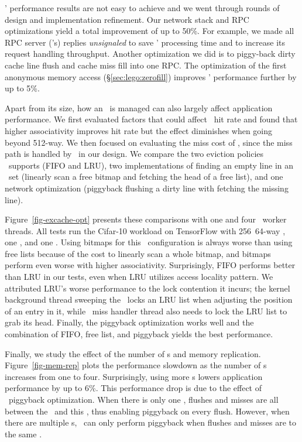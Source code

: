 \lego' performance results are not easy to achieve and we went through rounds of design and implementation refinement.
Our network stack and RPC optimizations yield a total improvement of up to 50\%.
For example, we made all RPC server (\mcomponent's) replies {\em unsignaled} to save \mcomponent' processing time
and to increase its request handling throughput.
Another optimization we did is to piggy-back dirty cache line flush and cache miss fill into one RPC.
The optimization of the first anonymous memory access (\S\ref{sec:lego:zerofill}) improves \lego' performance further by up to 5\%.

Apart from its size, how an \excache\ is managed can also largely affect application performance.
We first evaluated factors that could affect \excache\ hit rate and found that higher associativity improves hit rate
but the effect diminishes when going beyond 512-way.
We then focused on evaluating the miss cost of \excache, since the miss path is handled by \lego\ in our design.
We compare the two eviction policies \lego\ supports (FIFO and LRU),
two implementations of finding an empty line in an \excache\ set (linearly scan a free bitmap and fetching the head of a free list),
and one network optimization (piggyback flushing a dirty line with fetching the missing line).

Figure~\ref{fig-excache-opt} presents these comparisons with one and four \mcomponent\ worker threads. 
All tests run the Cifar-10 workload on TensorFlow with 256\MB\ 64-way \excache, one \mcomponent, and one \scomponent.
Using bitmaps for this \excache\ configuration is always worse than using free lists
because of the cost to linearly scan a whole bitmap,
and bitmaps perform even worse with higher associativity.
Surprisingly, FIFO performs better than LRU in our tests, even when LRU utilizes access locality pattern.
We attributed LRU's worse performance to the lock contention it incurs;
the kernel background thread sweeping the \excache\ locks an LRU list when adjusting the position of an entry in it,
while \excache\ miss handler thread also needs to lock the LRU list to grab its head.
Finally, the piggyback optimization works well and the combination of FIFO, free list, and piggyback yields the best performance.

Finally, we study the effect of the number of \mcomponent s and memory replication.
Figure~\ref{fig-mem-rep} plots the performance slowdown as the number of \mcomponent s increases from one to four.
Surprisingly, using more \mcomponent{}s lowers application performance by up to 6\%.
This performance drop is due to the effect of \excache\ piggyback optimization. 
When there is only one \mcomponent, flushes and misses are all between the \pcomponent\ and this \mcomponent,
thus enabling piggyback on every flush.
However, when there are multiple \mcomponent{}s, \lego\ can only perform piggyback when flushes and misses are to the same \mcomponent.

